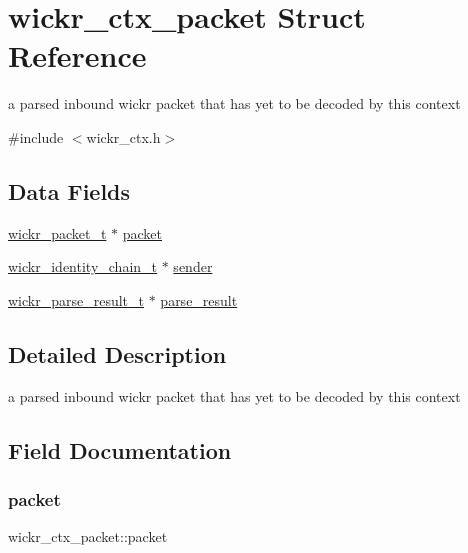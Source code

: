 \hypertarget{structwickr__ctx__packet}{}\section{wickr\+\_\+ctx\+\_\+packet Struct Reference}
\label{structwickr__ctx__packet}


a parsed inbound wickr packet that has yet to be decoded by this context  




{\ttfamily \#include $<$wickr\+\_\+ctx.\+h$>$}

\subsection*{Data Fields}
\begin{DoxyCompactItemize}
\item 
\hyperlink{structwickr__packet}{wickr\+\_\+packet\+\_\+t} $\ast$ \hyperlink{structwickr__ctx__packet_a0cdbc84b6fcc6115b8ddf21b235cc645}{packet}
\item 
\hyperlink{structwickr__identity__chain}{wickr\+\_\+identity\+\_\+chain\+\_\+t} $\ast$ \hyperlink{structwickr__ctx__packet_ac57d2b0f48fc3dad5b72d408e30b7b8b}{sender}
\item 
\hyperlink{structwickr__parse__result}{wickr\+\_\+parse\+\_\+result\+\_\+t} $\ast$ \hyperlink{structwickr__ctx__packet_a7bc4643a99b787536ee8b7505412ecce}{parse\+\_\+result}
\end{DoxyCompactItemize}


\subsection{Detailed Description}
a parsed inbound wickr packet that has yet to be decoded by this context 

\subsection{Field Documentation}
\mbox{\label{structwickr__ctx__packet_a0cdbc84b6fcc6115b8ddf21b235cc645}} 
\subsubsection{\texorpdfstring{packet}{packet}}
{\footnotesize\ttfamily wickr\+\_\+ctx\+\_\+packet\+::packet}

